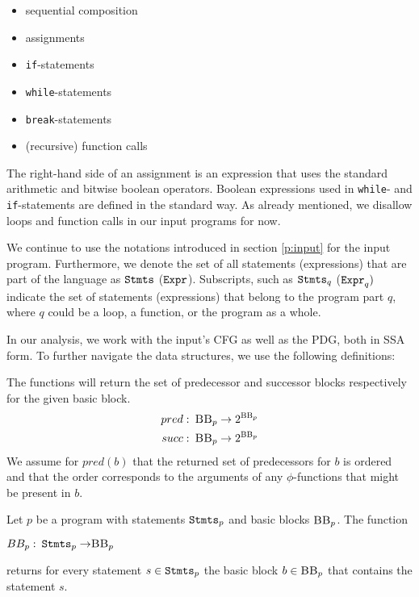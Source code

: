 \begin{multicols}{2}
    \begin{itemize}
    \setlength\itemsep{0em}
    \item sequential composition
    \item assignments
    \item \texttt{if}-statements
    \item \texttt{while}-statements
    \item \texttt{break}-statements
    \item (recursive) function calls
\end{itemize}
\end{multicols}



The right-hand side of an assignment is an expression that uses the standard arithmetic and bitwise boolean operators. Boolean expressions used in \texttt{while}- and \texttt{if}-statements are defined in the standard way. As already mentioned, we disallow loops and function calls in our input programs for now.

We continue to use the notations introduced in section \ref{p:input} for the input program. Furthermore,  we denote the set of all statements (expressions) that are part of the language as $\mathtt{Stmts}$ ($\mathtt{Expr}$). Subscripts, such as $\mathtt{Stmts}_q$ ($\mathtt{Expr}_q)$ indicate the set of statements (expressions) that belong to the program part $q$, where $q$ could be a loop, a function, or the program as a whole.

In our analysis, we work with the input's CFG as well as the PDG, both in SSA form. To further navigate the data structures, we use the following definitions:

\begin{definition}\label{def:succPred}
    The functions will return the set of predecessor and successor blocks respectively for the given basic block.
    \begin{align*}
        pred &: \: \textsc{BB}_p \to 2^{\textsc{BB}_p}\\
        succ &: \: \textsc{BB}_p \to 2^{\textsc{BB}_p}
    \end{align*}
    We assume for $pred(b)$ that the returned set of predecessors for $b$ is ordered and that the order corresponds to the arguments of any $\phi$-functions that might be present in $b$.
\end{definition}

\begin{definition}
    Let $p$ be a program with statements $\mathtt{Stmts}_p$ and basic blocks $\mbb_p$. The function
    \begin{center}
        $BB_p: \: \stmts_p \to \mbb_p$
    \end{center}
    returns for every statement $s \in \mathtt{Stmts}_p$ the basic block $b \in \textsc{BB}_p$ that contains the statement $s$.
\end{definition}

